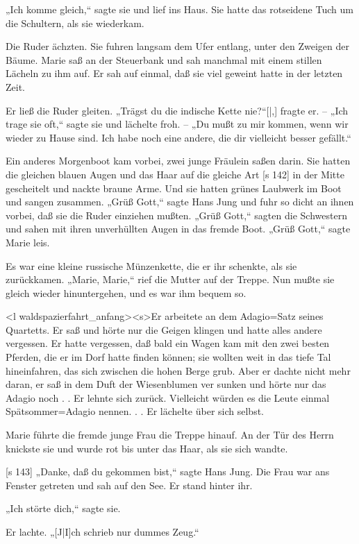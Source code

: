 „Ich komme gleich,“ sagte sie und lief ins Haus.
Sie hatte das rotseidene Tuch um die Schultern,
als sie wiederkam.

Die Ruder ächzten. Sie fuhren langsam dem
Ufer entlang, unter den Zweigen der Bäume. Marie
saß an der Steuerbank und sah manchmal mit einem
stillen Lächeln zu ihm auf. Er sah auf einmal, daß
sie viel geweint hatte in der letzten Zeit.

Er ließ die Ruder gleiten. „Trägst du die
indische Kette nie?“[|,] fragte er. – „Ich trage sie oft,“
sagte sie und lächelte froh. – „Du mußt zu mir
kommen, wenn wir wieder zu Hause sind. Ich habe
noch eine andere, die dir vielleicht besser gefällt.“

Ein anderes Morgenboot kam vorbei, zwei
junge Fräulein saßen darin. Sie hatten die gleichen
blauen Augen und das Haar auf die gleiche Art
[s 142]
in der Mitte gescheitelt und nackte braune Arme.
Und sie hatten grünes Laubwerk im Boot und
sangen zusammen. „Grüß Gott,“ sagte Hans Jung
und fuhr so dicht an ihnen vorbei, daß sie die
Ruder einziehen mußten. „Grüß Gott,“ sagten die
Schwestern und sahen mit ihren unverhüllten Augen
in das fremde Boot. „Grüß Gott,“ sagte Marie leis.

Es war eine kleine russische Münzenkette, die
er ihr schenkte, als sie zurückkamen. „Marie, Marie,“
rief die Mutter auf der Treppe. Nun mußte sie gleich
wieder hinuntergehen, und es war ihm bequem so.

<l waldspazierfahrt_anfang><s>Er arbeitete an dem Adagio=Satz seines
Quartetts. Er saß und hörte nur die Geigen klingen
und hatte alles andere vergessen. Er hatte vergessen,
daß bald ein Wagen kam mit den zwei besten Pferden,
die er im Dorf hatte finden können; sie wollten
weit in das tiefe Tal hineinfahren, das sich zwischen
die hohen Berge grub. Aber er dachte nicht mehr
daran, er saß in dem Duft der Wiesenblumen ver­
sunken und hörte nur das Adagio noch . . Er lehnte
sich zurück. Vielleicht würden es die Leute einmal
Spätsommer=Adagio nennen. . . Er lächelte über
sich selbst.

Marie führte die fremde junge Frau die Treppe
hinauf. An der Tür des Herrn knickste sie und
wurde rot bis unter das Haar, als sie sich wandte.

[s 143]
„Danke, daß du gekommen bist,“ sagte Hans
Jung. Die Frau war ans Fenster getreten und sah
auf den See. Er stand hinter ihr.

„Ich störte dich,“ sagte sie.

Er lachte. „[J|I]ch schrieb nur dummes Zeug.“

